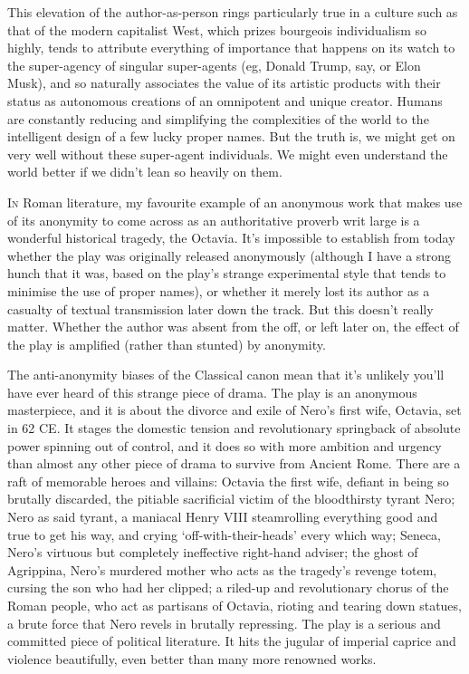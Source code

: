 \documentclass[../main.tex]{subfiles}
\begin{document}
\begin{multicols}{2}
This elevation of the author-as-person rings particularly true in a culture such as that of the modern capitalist West, which prizes bourgeois individualism so highly, tends to attribute everything of importance that happens on its watch to the super-agency of singular super-agents (eg, Donald Trump, say, or Elon Musk), and so naturally associates the value of its artistic products with their status as autonomous creations of an omnipotent and unique creator. Humans are constantly reducing and simplifying the complexities of the world to the intelligent design of a few lucky proper names. But the truth is, we might get on very well without these super-agent individuals. We might even understand the world better if we didn’t lean so heavily on them. 

\lettrine{I}{n} Roman literature, my favourite example of an anonymous work that makes use of its anonymity to come across as an authoritative proverb writ large is a wonderful historical tragedy, the Octavia. It’s impossible to establish from today whether the play was originally released anonymously (although I have a strong hunch that it was, based on the play’s strange experimental style that tends to minimise the use of proper names), or whether it merely lost its author as a casualty of textual transmission later down the track. But this doesn’t really matter. Whether the author was absent from the off, or left later on, the effect of the play is amplified (rather than stunted) by anonymity. 

The anti-anonymity biases of the Classical canon mean that it’s unlikely you’ll have ever heard of this strange piece of drama. The play is an anonymous masterpiece, and it is about the divorce and exile of Nero’s first wife, Octavia, set in 62 CE. It stages the domestic tension and revolutionary springback of absolute power spinning out of control, and it does so with more ambition and urgency than almost any other piece of drama to survive from Ancient Rome. There are a raft of memorable heroes and villains: Octavia the first wife, defiant in being so brutally discarded, the pitiable sacrificial victim of the bloodthirsty tyrant Nero; Nero as said tyrant, a maniacal Henry VIII steamrolling everything good and true to get his way, and crying ‘off-with-their-heads’ every which way; Seneca, Nero’s virtuous but completely ineffective right-hand adviser; the ghost of Agrippina, Nero’s murdered mother who acts as the tragedy’s revenge totem, cursing the son who had her clipped; a riled-up and revolutionary chorus of the Roman people, who act as partisans of Octavia, rioting and tearing down statues, a brute force that Nero revels in brutally repressing. The play is a serious and committed piece of political literature. It hits the jugular of imperial caprice and violence beautifully, even better than many more renowned works. 


\end{multicols}
\end{document}
